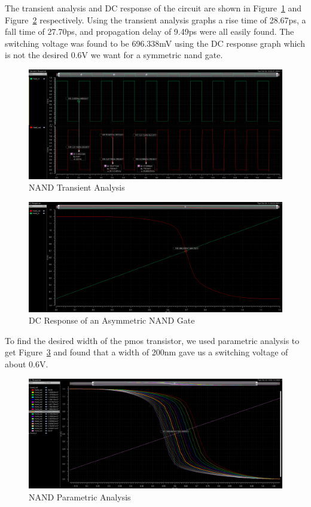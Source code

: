 \documentclass[12pt]{article}
\begin{document}
The transient analysis and DC response of the circuit are shown in Figure~\ref{fig:nand_tran} and Figure~\ref{fig:nand_dc_asymm} respectively. Using the transient analysis graphs a
rise time of 28.67ps, a fall time of 27.70ps, and propagation delay of 9.49ps were all easily found. The switching voltage was found to be 696.338mV using the DC response graph
which is not the desired 0.6V we want for a symmetric nand gate.
\begin{figure}[!htb]
  \centering
  \includegraphics[width=5in]{figures/nand/nand_tran.png}
  \caption{NAND Transient Analysis}\label{fig:nand_tran}
\end{figure}
\begin{figure}[!htb]
  \centering
  \includegraphics[width=5in]{figures/nand/nand_dc_asymm.png}
  \caption{DC Response of an Asymmetric NAND Gate}\label{fig:nand_dc_asymm}
\end{figure}
To find the desired width of the pmos transistor, we used parametric analysis to get Figure~\ref{fig:nand_param} and found that a width of 200nm gave us a switching voltage of
about 0.6V.
\begin{figure}[!htb]
  \centering
  \includegraphics[width=5in]{figures/nand/nand_param.png}
  \caption{NAND Parametric Analysis}\label{fig:nand_param}
\end{figure}
\end{document}
